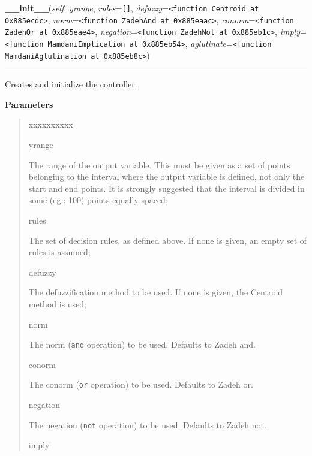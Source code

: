     \begin{boxedminipage}{\textwidth}

    \raggedright \textbf{\_\_init\_\_}(\textit{self}, \textit{yrange}, \textit{rules}=\texttt{\texttt{[}\texttt{]}}, \textit{defuzzy}=\texttt{{\textless}function Centroid at 0x885ecdc{\textgreater}}, \textit{norm}=\texttt{{\textless}function ZadehAnd at 0x885eaac{\textgreater}}, \textit{conorm}=\texttt{{\textless}function ZadehOr at 0x885eae4{\textgreater}}, \textit{negation}=\texttt{{\textless}function ZadehNot at 0x885eb1c{\textgreater}}, \textit{imply}=\texttt{{\textless}function MamdaniImplication at 0x885eb54{\textgreater}}, \textit{aglutinate}=\texttt{{\textless}function MamdaniAglutination at 0x885eb8c{\textgreater}})

    \vspace{-1.5ex}

    \rule{\textwidth}{0.5\fboxrule}

Creates and initialize the controller.
    \vspace{1ex}

      \textbf{Parameters}
      \begin{quote}
        \begin{Ventry}{xxxxxxxxxx}

          \item[yrange]


The range of the output variable. This must be given as a set of
points belonging to the interval where the output variable is
defined, not only the start and end points. It is strongly suggested
that the interval is divided in some (eg.: 100) points equally
spaced;
          \item[rules]


The set of decision rules, as defined above. If none is given, an
empty set of rules is assumed;
          \item[defuzzy]


The defuzzification method to be used. If none is given, the
Centroid method is used;
          \item[norm]


The norm (\texttt{and} operation) to be used. Defaults to Zadeh and.
          \item[conorm]


The conorm (\texttt{or} operation) to be used. Defaults to Zadeh or.
          \item[negation]


The negation (\texttt{not} operation) to be used. Defaults to Zadeh not.
          \item[imply]



\end{Ventry}
\end{quote}
\end{boxedminipage}
